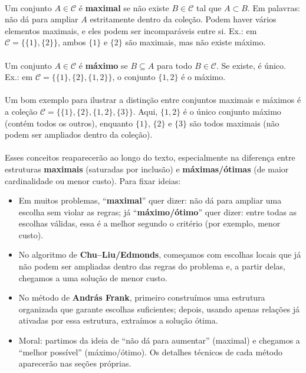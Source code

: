 \documentclass[12pt,a4paper]{article}
\begin{document}
\paragraph{}
Um conjunto \(A\in\mathcal{C}\) é \textbf{maximal} se não existe \(B\in\mathcal{C}\) tal que \(A\subset B\). Em palavras: não dá para ampliar \(A\) estritamente dentro da coleção. Podem haver vários elementos maximais, e eles podem ser incomparáveis entre si. Ex.: em \(\mathcal{C}=\big\{\{1\},\{2\}\big\}\), ambos \(\{1\}\) e \(\{2\}\) são maximais, mas não existe máximo.

\paragraph{}
Um conjunto \(A\in\mathcal{C}\) é \textbf{máximo} se \(B\subseteq A\) para todo \(B\in\mathcal{C}\). Se existe, é único. Ex.: em \(\mathcal{C}=\big\{\{1\},\{2\},\{1,2\}\big\}\), o conjunto \(\{1,2\}\) é o máximo.

\paragraph{}
Um bom exemplo para ilustrar a distinção entre conjuntos maximais e máximos é a coleção \(\mathcal{C}=\big\{\{1\},\{2\},\{1,2\},\{3\}\big\}\). Aqui, \(\{1,2\}\) é o único conjunto máximo (contém todos os outros), enquanto \(\{1\}\), \(\{2\}\) e \(\{3\}\) são todos maximais (não podem ser ampliados dentro da coleção).

\paragraph{}
Esses conceitos reaparecerão ao longo do texto, especialmente na diferença entre estruturas \textbf{maximais} (saturadas por inclusão) e \textbf{máximas/ótimas} (de maior cardinalidade ou menor custo). Para fixar ideias:
\begin{itemize}
    \item Em muitos problemas, “\textbf{maximal}” quer dizer: não dá para ampliar uma escolha sem violar as regras; já “\textbf{máximo/ótimo}” quer dizer: entre todas as escolhas válidas, essa é a melhor segundo o critério (por exemplo, menor custo).
    \item No algoritmo de \textbf{Chu--Liu/Edmonds}, começamos com escolhas locais que já não podem ser ampliadas dentro das regras do problema e, a partir delas, chegamos a uma solução de menor custo.
    \item No método de \textbf{András Frank}, primeiro construímos uma estrutura organizada que garante escolhas suficientes; depois, usando apenas relações já ativadas por essa estrutura, extraímos a solução ótima.
    \item Moral: partimos da ideia de “não dá para aumentar” (maximal) e chegamos a “melhor possível” (máximo/ótimo). Os detalhes técnicos de cada método aparecerão nas seções próprias.
\end{itemize}
\end{document}
